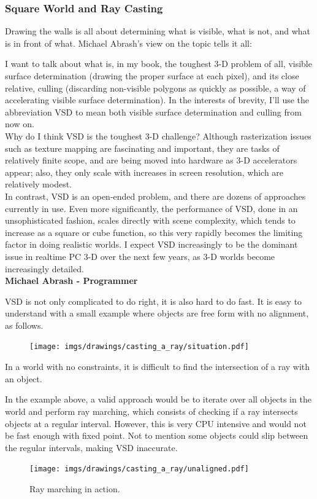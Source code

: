 \subsubsection{Square World and Ray Casting}
Drawing the walls is all about determining what is visible, what is not, and what is in front of what. Michael Abrash's view on the topic tells it all:\\
\par
\begin{fancyquotes}
I want to talk about what is, in my book, the toughest 3-D problem of all, visible surface determination (drawing the proper surface at each pixel), and its close relative, culling (discarding non-visible polygons as quickly as possible, a way of accelerating visible surface determination). In the interests of brevity, I'll use the abbreviation VSD to mean both visible surface determination and culling from now on.
 \bigskip \\
Why do I think VSD is the toughest 3-D challenge? Although rasterization issues such as texture mapping are fascinating and important, they are tasks of relatively finite scope, and are being moved into hardware as 3-D accelerators appear; also, they only scale with increases in screen resolution, which are relatively modest.
 \bigskip \\
In contrast, VSD is an open-ended problem, and there are dozens of approaches currently in use. Even more significantly, the performance of VSD, done in an unsophisticated fashion, scales directly with scene complexity, which tends to increase as a square or cube function, so this very rapidly becomes the limiting factor in doing realistic worlds. I expect VSD increasingly to be the dominant issue in realtime PC 3-D over the next few years, as 3-D worlds become increasingly detailed.
 \bigskip \\
\textbf{Michael Abrash - Programmer}
 \end{fancyquotes}
 \par
VSD is not only complicated to do right, it is also hard to do fast. It is easy to understand with a small example where objects are free form with no alignment, as follows.

\par
\begin{figure}[H]
\centering
\texttt{[image: imgs/drawings/casting\_a\_ray/situation.pdf]}
 
\end{figure}

In a world with no constraints, it is difficult to find the intersection of a ray with an object.\\
\par
In the example above, a valid approach would be to iterate over all objects in the world and perform ray marching, which consists of checking if a ray intersects objects at a regular interval. However, this is very CPU intensive and would not be fast enough with fixed point. Not to mention some objects could slip between the regular intervals, making VSD inaccurate.
\begin{figure}[H]
\centering
\texttt{[image: imgs/drawings/casting\_a\_ray/unaligned.pdf]}
 \caption{Ray marching in action.}
\end{figure}


